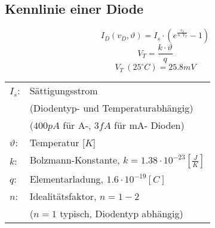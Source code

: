



\subsection{Kennlinie einer Diode}
\[ I_D(v_D, \vartheta) = I_s \cdot \left(e^{\frac{v_d}{n \cdot V_T}} - 1\right) \]
\[ V_T = \frac{k \cdot \vartheta}{q} \]
\[ V_T~(25^\circ C) = 25.8 mV \]
\begin{tabular}{@{}ll}
  $I_s$:        & Sättigungsstrom \\
                & (Diodentyp- und Temperaturabhängig) \\
                & ($400 pA$ für A-, $3 fA$ für mA- Dioden) \\
  $\vartheta$:  & Temperatur [$K$] \\
  $k$:          & Bolzmann-Konstante, $k=1.38 \cdot 10^{-23} [\frac{J}{K}]$ \\
  $q$:          & Elementarladung, $1.6 \cdot 10^{-19} [C]$ \\
  $n$:          & Idealitätsfaktor, $n = 1-2$ \\
                & ($n = 1$ typisch, Diodentyp abhängig)
\end{tabular}